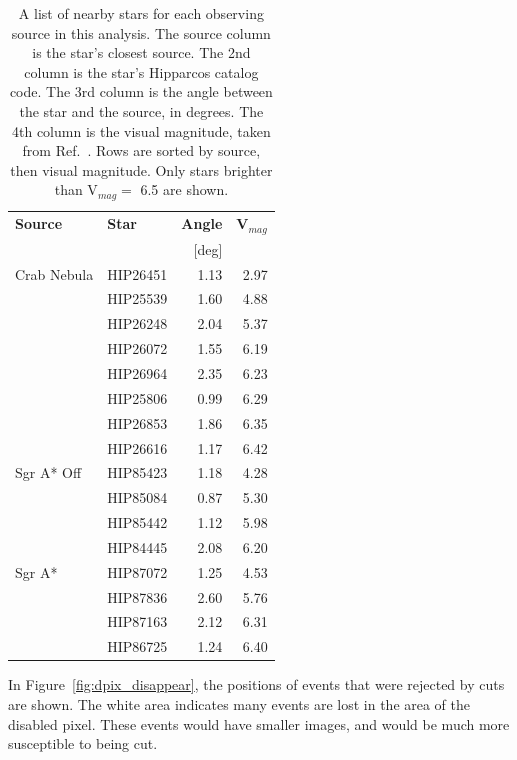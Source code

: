 \begin{table}[t]
  \centering
  \begin{tabular}{|l|l|r|r|}
    \hline
    \textbf{Source} & \textbf{Star} & \textbf{Angle} & \textbf{V${}_{mag}$} \\ 
                    &               & [deg]             &                      \\
    \hline
    Crab Nebula & HIP26451 & 1.13 & 2.97 \\
                & HIP25539 & 1.60 & 4.88 \\
                & HIP26248 & 2.04 & 5.37 \\
                & HIP26072 & 1.55 & 6.19 \\
                & HIP26964 & 2.35 & 6.23 \\
                & HIP25806 & 0.99 & 6.29 \\
                & HIP26853 & 1.86 & 6.35 \\
                & HIP26616 & 1.17 & 6.42 \\
    \hline
    Sgr A* Off  & HIP85423 & 1.18 & 4.28 \\
                & HIP85084 & 0.87 & 5.30 \\
                & HIP85442 & 1.12 & 5.98 \\
                & HIP84445 & 2.08 & 6.20 \\
    \hline
    Sgr A*      & HIP87072 & 1.25 & 4.53 \\
                & HIP87836 & 2.60 & 5.76 \\
                & HIP87163 & 2.12 & 6.31 \\
                & HIP86725 & 1.24 & 6.40 \\
    \hline
  \end{tabular}
  \caption[Bright Stars in the Fields of View]{
    A list of nearby stars for each observing source in this analysis.
    The source column is the star's closest source.
    The 2nd column is the star's Hipparcos catalog code.
    The 3rd column is the angle between the star and the source, in degrees.
    The 4th column is the visual magnitude, taken from Ref.~\cite{hipparcos_catalogue}.
    Rows are sorted by source, then visual magnitude.
    Only stars brighter than V${}_{mag}=$ 6.5 are shown.
  }
  \label{tab:brightstars}
\end{table}

In Figure~\ref{fig:dpix_disappear}, the positions of events that were rejected by cuts are shown.
The white area indicates many events are lost in the area of the disabled pixel.
These events would have smaller images, and would be much more susceptible to being cut.

